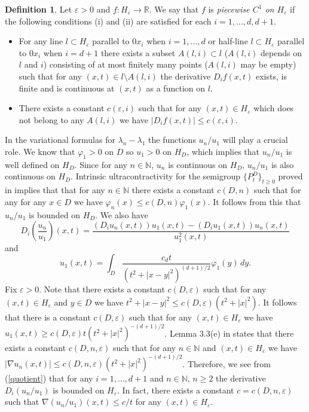 \documentclass[11pt,leqno]{article}
\theoremstyle{definition}
\newtheorem{defn}{Definition}[section]
\newcommand{\R}{\mathbb{R}}
\newcommand{\NP}{\mathbb{N}}
\newcommand{\eps}{\varepsilon}
\numberwithin{equation}{section}
\begin{document}
\begin{defn}
Let $\eps > 0$ and $f: H_{\eps} \to \R$. We say
 that $f$ is { \it piecewise $C^{1}$ on $H_{\eps}$} if the 
following conditions (i) and (ii) are satisfied for each $i
= 1, \ldots, d, d + 1$. 
\begin{itemize}
\item[(i)] For any line $l \subset H_{\eps}$ parallel to $0x_i$ when $i=1, \ldots, d$ or half-line $l \subset
H_{\eps}$ parallel to $0x_i$ when $i = d + 1$ there exists a subset $A(l,i) \subset l$ ($A(l,i)$ depends on $l$ and
$i$) consisting of at most finitely many points ($A(l,i)$ may be empty) such that for any $(x,t) \in l \setminus
A(l,i)$ the derivative $D_i f(x,t)$ exists, is finite and is continuous at $(x,t)$ as a function on $l$.

\item[(ii)] There exists a constant $c(\eps,i)$ such that for any $(x,t) \in H_{\eps}$ which 
 does not belong to any $A(l,i)$ we have $|D_i f(x,t)| \le c(\eps,i)$.
\end{itemize}
\end{defn}

In the variational formulas for $\lambda_n - \lambda_1$ the   functions $u_n/u_1$ will play a crucial role. 
 We know that $\varphi_1 > 0$ on $D$ so $u_1 > 0$ on $H_D$,
which implies that $u_n/u_1$ is well defined on $H_D$. Since for any $n \in \NP$,  $u_n$ is 
continuous on $H_D$, 
$u_n/u_1$ is also continuous on $H_D$. Intrinsic ultracontractivity for the semigroup $\{P_t^D\}_{t \ge 0}$
proved in \cite{K} implies that that for any $n \in \NP$ there exists a constant $c(D,n)$ such that for
any for any  $x \in D$ we have $\varphi_n(x) \le c(D,n) \varphi_1(x)$. It follows from this that $u_n/u_1$ is
bounded on $H_D$. We also have
\begin{equation}
\label{quotient}
D_i\left(\frac{u_n}{u_1}\right)(x,t) = 
\frac{(D_i u_n(x,t)) u_1(x,t) - (D_i u_1(x,t)) u_n(x,t)}{u_1^2(x,t)}
\end{equation} 
and
\begin{equation}
\label{u1formula}
u_1(x,t) = \int_D \frac{c_d t}{(t^2 + |x - y|^2)^{(d + 1)/2}} \varphi_1(y) \, dy.
\end{equation}
Fix $\eps > 0$. Note that there exists a constant $c(D,\eps)$ such that for any $(x,t) \in H_{\eps}$ and $y \in D$ we have $t^2 + |x - y|^2 \le c(D,\eps) (t^2 + |x|^2)$. 
It follows that there is  a constant $c(D,\eps)$ such that for any $(x,t) \in H_{\eps}$ we have $u_1(x,t) \ge
c(D,\eps) t (t^2 + |x|^2)^{-(d + 1)/2}$. Lemma 3.3(e) in \cite{BK} states that there exists a constant $c(D,n,\eps)$
such that for any $n \in \NP$ and $(x,t) \in H_{\eps}$ we have $|\nabla u_n(x,t)| \le c(D,n,\eps) (t^2 + |x|^2)^{-(d
+ 1)/2}$. Therefore, we see from (\ref{quotient}) that for any $i = 1, \ldots, d + 1$ and $n \in \NP$, $n \ge 2$
the derivative $D_i (u_n/u_1)$ is bounded on $H_{\eps}$. In fact, there exists a constant $c = c(D,n,\eps)$ such that
$\nabla(u_n/u_1)(x,t) \le c/t$ for any $(x,t) \in H_{\eps}$.
\end{document}

